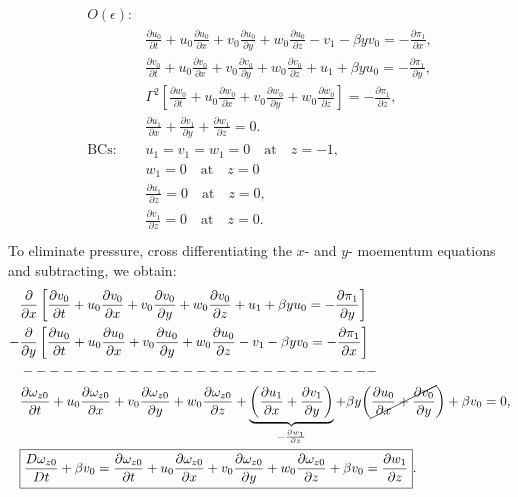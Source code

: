 \documentclass{article}
\newcommand{\pd}[2]{\frac{\partial{#1}}{\partial{#2}}}
\begin{document}
\begin{align}\label{eq:order-eps-outer}
 \begin{split}
 O(\epsilon):& \\
 & \pd{u_{0}}{t} + u_{0}\pd{u_{0}}{x} + v_{0}\pd{u_{0}}{y} + w_{0}\pd{u_{0}}{z} - v_{1} - \beta y v_{0} = -\pd{\pi_{1}}{x}, \\
 & \pd{v_{0}}{t} + u_{0}\pd{v_{0}}{x} + v_{0}\pd{v_{0}}{y} + w_{0}\pd{v_{0}}{z} + u_{1} + \beta y u_{0} = -\pd{\pi_{1}}{y}, \\
 &%
 \Gamma^{2} \left[ \pd{w_{0}}{t} + u_{0}\pd{w_{0}}{x} + v_{0}\pd{w_{0}}{y} + w_{0}\pd{w_{0}}{z} \right] = -\pd{\pi_{1}}{z}, \\
 &\pd{u_{1}}{x} + \pd{v_{1}}{y} + \pd{w_{1}}{z} = 0.\\
  \textrm{BCs}:& u_{1} = v_{1} = w_{1} = 0 \quad \textrm{at} \quad z = -1, \\
 & w_{1} = 0 \quad \textrm{at} \quad z = 0 \\
 & \pd{u_{1}}{z} = 0 \quad \textrm{at} \quad z = 0, \\
 & \pd{v_{1}}{z} = 0 \quad \textrm{at} \quad z = 0. \\
 \end{split}
\end{align}
%
To eliminate pressure, cross differentiating the $x$- and $y$- moementum equations and subtracting, we obtain:
\begin{align}\label{eq:qg_vorticity}
 \begin{split}
  & \pd{}{x}\left[\pd{v_{0}}{t} + u_{0}\pd{v_{0}}{x} + v_{0}\pd{v_{0}}{y} + w_{0}\pd{v_{0}}{z} + u_{1} + \beta y u_{0} = -\pd{\pi_{1}}{y}\right]\\
  -&\pd{}{y}\left[ \pd{u_{0}}{t} + u_{0}\pd{u_{0}}{x} + v_{0}\pd{u_{0}}{y} + w_{0}\pd{u_{0}}{z} - v_{1} - \beta y v_{0} = -\pd{\pi_{1}}{x}\right]\\
  & --------------------------- \\
  & \pd{\omega_{z0}}{t} + u_{0}\pd{\omega_{z0}}{x} + v_{0}\pd{\omega_{z0}}{y} + w_{0}\pd{\omega_{z0}}{z} + \underbrace{\left( \pd{u_{1}}{x} + \pd{v_{1}}{y}\right)}_{-\pd{w_{1}}{z}} + \beta y \bigg( \cancel{\pd{u_{0}}{x} + \pd{v_{0}}{y}}\bigg) + \beta v_{0} = 0,\\
  & \boxed{\frac{D\omega_{z0}}{Dt} + \beta v_{0} = \pd{\omega_{z0}}{t} + u_{0}\pd{\omega_{z0}}{x} + v_{0}\pd{\omega_{z0}}{y} + w_{0}\pd{\omega_{z0}}{z} + \beta v_{0} = \pd{w_{1}}{z} }.
 \end{split}
\end{align}
\end{document}
